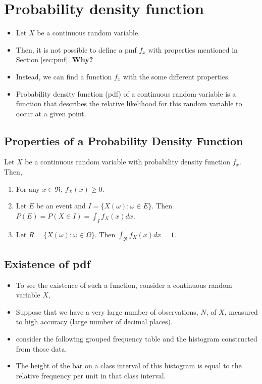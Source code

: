 \documentclass[]{book}
\providecommand{\tightlist}{%
  \setlength{\itemsep}{0pt}\setlength{\parskip}{0pt}}
\begin{document}
\hypertarget{probability-density-function}{%
\section{Probability density function}\label{probability-density-function}}

\begin{itemize}
\item
  Let \(X\) be a continuous random variable.
\item
  Then, it is not possible to define a pmf \(f_x\) with properties mentioned in Section \ref{sec:pmf}. \textbf{Why?}
\item
  Instead, we can find a function \(f_x\) with the some different properties.
\item
  Probability density function (pdf) of a continuous random variable is a function that describes the relative likelihood for this random variable to occur at a given point.
\end{itemize}

\hypertarget{properties-of-a-probability-density-function}{%
\subsection{Properties of a Probability Density Function}\label{properties-of-a-probability-density-function}}

Let \(X\) be a continuous random variable with probability density function \(f_x\). Then,

\begin{enumerate}
\def\labelenumi{\arabic{enumi}.}
\tightlist
\item
  For any \(x\in \Re\), \(f_X(x) \geq0\).
\item
  Let \(E\) be an event and \(I= \{X(\omega):\omega \in E\}.\) Then \(P(E) = P(X\in I) = \int_If_X(x)dx.\)
\item
  Let \(R = \{X(\omega):\omega \in \Omega\}.\) Then \(\int_\Re f_X(x)dx= 1.\)
\end{enumerate}

\hypertarget{existence-of-pdf}{%
\subsection{Existence of pdf}\label{existence-of-pdf}}

\begin{itemize}
\tightlist
\item
  To see the existence of such a function, consider a continuous random variable \(X\),
\item
  Suppose that we have a very large number of observations, \(N\), of \(X\), measured to high accuracy (large number of decimal places).
\item
  consider the following grouped frequency table and the histogram constructed from those data.
\item
  The height of the bar on a class interval of this histogram is equal to the relative frequency per unit in that class interval.
  \newpage
\end{itemize}
\end{document}
